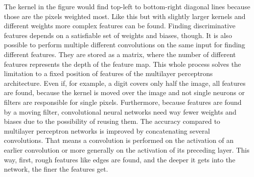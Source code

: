 The kernel in the figure would find top-left to bottom-right diagonal lines because those are the pixels weighted most.
Like this but with slightly larger kernels and different weights more complex features can be found.
Finding discriminative features depends on a satisfiable set of weights and biases, though.
It is also possible to perform multiple different convolutions on the same input for finding different features.
They are stored as a matrix, where the number of different features represents the depth of the feature map.
This whole process solves the limitation to a fixed position of features of the multilayer perceptrons architecture.
Even if, for example, a digit covers only half the image, all features are found, because the kernel is moved over the image and not single neurons or filters are responsible for single pixels.
Furthermore, because features are found by a moving filter, convolutional neural networks need way fewer weights and biases due to the possibility of reusing them.
The accuracy compared to multilayer perceptron networks is improved by concatenating several convolutions.
That means a convolution is performed on the activation of an earlier convolution or more generally on the activation of its preceding layer.
This way, first, rough features like edges are found, and the deeper it gets into the network, the finer the features get.